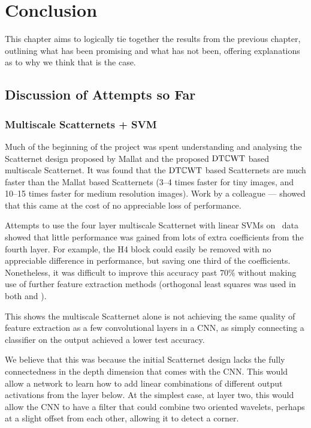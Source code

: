 \chapter{Conclusion}\label{ch:conclusion}
  This chapter aims to logically tie together the results from the previous
  chapter, outlining what has been promising and what has not been, offering
  explanations as to why we think that is the case.

\section{Discussion of Attempts so Far}
\subsection{Multiscale Scatternets + SVM}
  Much of the beginning of the project was spent understanding and analysing the
  Scatternet design proposed by Mallat and the proposed $\mathrm{DT}\mathbb{C}\mathrm{WT}$ based
  multiscale Scatternet. It was found that the $\mathrm{DT}\mathbb{C}\mathrm{WT}$ based Scatternets are
  much faster than the Mallat based Scatternets (3--4 times faster for tiny
  images, and 10--15 times faster for medium resolution images).
  Work by a colleague --- \citet{singh_multi-resolution_2017} showed that this
  came at the cost of no appreciable loss of performance.

  Attempts to use the four layer multiscale Scatternet with linear SVMs on
  \cifar\ data showed that little performance was gained from lots of extra
  coefficients from the fourth layer. For example, the H4 block could easily be
  removed with no appreciable difference in performance, but saving one third
  of the coefficients. Nonetheless, it was difficult to improve this accuracy
  past $70\%$ without making use of further feature extraction methods
  (orthogonal least squares was used in both \citep{oyallon_deep_2015} and
  \citep{singh_multi-resolution_2017}).

  This shows the multiscale Scatternet alone is not achieving
  the same quality of feature extraction  as
  a few convolutional layers in a CNN, as simply connecting a classifier on the
  output achieved a lower test accuracy.

  We believe that this was because the initial Scatternet design lacks the
  fully connectedness in the depth dimension that comes
  with the CNN\@. This would allow a network to learn how to add linear
  combinations of different output activations from the layer below. At the
  simplest case, at layer two, this would allow the CNN to have a filter that
  could combine two oriented wavelets, perhaps at a slight offset from each
  other, allowing it to detect a corner. 


